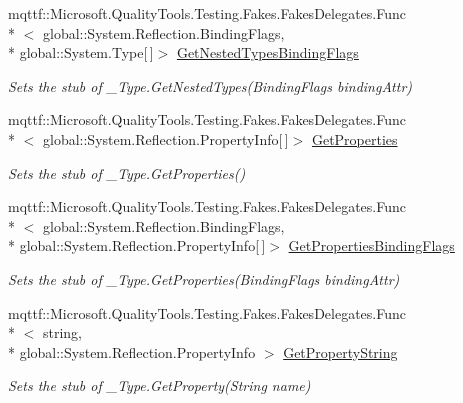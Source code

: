 \begin{DoxyCompactItemize}
mqttf\-::\-Microsoft.\-Quality\-Tools.\-Testing.\-Fakes.\-Fakes\-Delegates.\-Func\\*
$<$ global\-::\-System.\-Reflection.\-Binding\-Flags, \\*
global\-::\-System.\-Type\mbox{[}$\,$\mbox{]}$>$ \hyperlink{class_system_1_1_runtime_1_1_interop_services_1_1_fakes_1_1_stub___type_a5eeb5aacbbef426704c3110343d3a7ef}{Get\-Nested\-Types\-Binding\-Flags}
\begin{DoxyCompactList}\small\item\em Sets the stub of \-\_\-\-Type.\-Get\-Nested\-Types(\-Binding\-Flags binding\-Attr)\end{DoxyCompactList}\item 
mqttf\-::\-Microsoft.\-Quality\-Tools.\-Testing.\-Fakes.\-Fakes\-Delegates.\-Func\\*
$<$ global\-::\-System.\-Reflection.\-Property\-Info\mbox{[}$\,$\mbox{]}$>$ \hyperlink{class_system_1_1_runtime_1_1_interop_services_1_1_fakes_1_1_stub___type_a0c9aa11fd15d1598c9f8b3cd98e7cc65}{Get\-Properties}
\begin{DoxyCompactList}\small\item\em Sets the stub of \-\_\-\-Type.\-Get\-Properties()\end{DoxyCompactList}\item 
mqttf\-::\-Microsoft.\-Quality\-Tools.\-Testing.\-Fakes.\-Fakes\-Delegates.\-Func\\*
$<$ global\-::\-System.\-Reflection.\-Binding\-Flags, \\*
global\-::\-System.\-Reflection.\-Property\-Info\mbox{[}$\,$\mbox{]}$>$ \hyperlink{class_system_1_1_runtime_1_1_interop_services_1_1_fakes_1_1_stub___type_a25001543236d72d9e33b39b2524c7727}{Get\-Properties\-Binding\-Flags}
\begin{DoxyCompactList}\small\item\em Sets the stub of \-\_\-\-Type.\-Get\-Properties(\-Binding\-Flags binding\-Attr)\end{DoxyCompactList}\item 
mqttf\-::\-Microsoft.\-Quality\-Tools.\-Testing.\-Fakes.\-Fakes\-Delegates.\-Func\\*
$<$ string, \\*
global\-::\-System.\-Reflection.\-Property\-Info $>$ \hyperlink{class_system_1_1_runtime_1_1_interop_services_1_1_fakes_1_1_stub___type_afbf085bc7997d53897b61dc020d553a7}{Get\-Property\-String}
\begin{DoxyCompactList}\small\item\em Sets the stub of \-\_\-\-Type.\-Get\-Property(\-String name)\end{DoxyCompactList}\item 

\end{DoxyCompactItemize}
